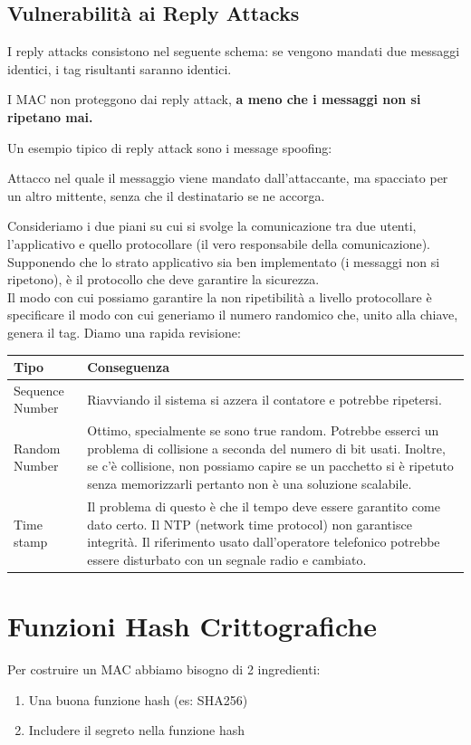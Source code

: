 \subsection{Vulnerabilità ai Reply Attacks}
I reply attacks consistono nel seguente schema: se vengono mandati due messaggi identici, i tag risultanti saranno identici.
\begin{proposition}\label{prop:macreplay}
I MAC non proteggono dai reply attack, \textbf{a meno che i messaggi non si ripetano mai.}
\end{proposition}
Un esempio tipico di reply attack sono i message spoofing:
\begin{definition}
Attacco nel quale il messaggio viene mandato dall'attaccante, ma spacciato per un altro mittente, senza che il destinatario se ne accorga.
\end{definition}
Consideriamo i due piani su cui si svolge la comunicazione tra due utenti, l'applicativo e quello protocollare (il vero responsabile della comunicazione). Supponendo che lo strato applicativo sia ben implementato (i messaggi non si ripetono), è il protocollo che deve garantire la sicurezza.\\
Il modo con cui possiamo garantire la non ripetibilità a livello protocollare è specificare il modo con cui generiamo il numero randomico che, unito alla chiave, genera il tag. Diamo una rapida revisione:
\begin{table}[ht]
    \centering
    \begin{tabular}{ |p{}|p{}|  }
    \hline
    \textbf{Tipo}&\textbf{Conseguenza}\\
    \hline
    Sequence Number & Riavviando il sistema si azzera il contatore e potrebbe ripetersi.\\
    \hline
    Random Number & Ottimo, specialmente se sono true random. Potrebbe esserci un problema di collisione a seconda del numero di bit usati. Inoltre, se c'è collisione, non possiamo capire se un pacchetto si è ripetuto senza memorizzarli pertanto non è una soluzione scalabile.\\
    \hline
    Time stamp & Il problema di questo è che il tempo deve essere garantito come dato certo. Il NTP (network time protocol) non garantisce integrità. Il riferimento usato dall'operatore telefonico potrebbe essere disturbato con un segnale radio e cambiato.\\
    \hline
    \end{tabular}
\end{table}
\section{Funzioni Hash Crittografiche}
Per costruire un MAC abbiamo bisogno di 2 ingredienti:
\begin{enumerate}
    \item Una buona funzione hash (es: SHA256)
    \item Includere il segreto nella funzione hash
\end{enumerate}
